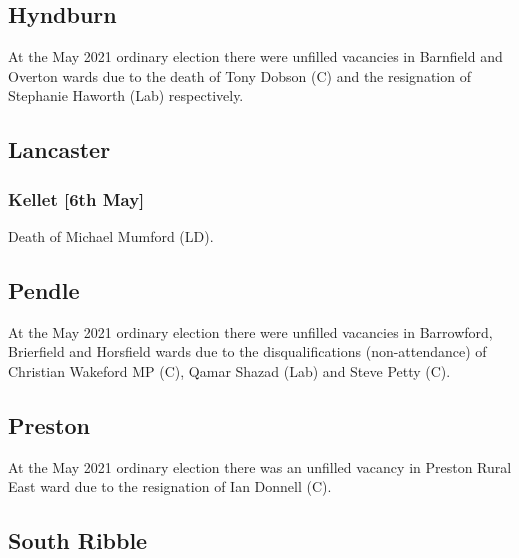 \documentclass[a4paper,openany]{book}
\begin{document}
\begin{resultsiii}
\subsection*{Hyndburn}

At the May 2021 ordinary election there were unfilled vacancies in Barnfield and Overton wards due to the death of Tony Dobson (C) and the resignation of Stephanie Haworth (Lab) respectively.

\subsection*{Lancaster}

\subsubsection*{Kellet \hspace*{\fill}\nolinebreak[1]%
	\enspace\hspace*{\fill}
	[6th May]}


Death of Michael Mumford (LD).

\subsection*{Pendle}

At the May 2021 ordinary election there were unfilled vacancies in Barrowford, Brierfield and Horsfield wards due to the disqualifications (non-attendance) of Christian Wakeford MP (C), Qamar Shazad (Lab) and Steve Petty (C).

\subsection*{Preston}

At the May 2021 ordinary election there was an unfilled vacancy in Preston Rural East ward due to the resignation of Ian Donnell (C).

\subsection*{South Ribble}


\end{resultsiii}
\end{document}
